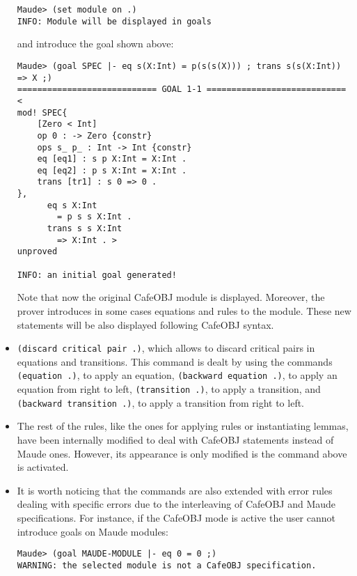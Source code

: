 \begin{itemize}
{\codesize
\begin{verbatim}
Maude> (set module on .)
INFO: Module will be displayed in goals
\end{verbatim}
}

\noindent
and introduce the goal shown above:

{\codesize
\begin{verbatim}
Maude> (goal SPEC |- eq s(X:Int) = p(s(s(X))) ; trans s(s(X:Int)) => X ;)
============================ GOAL 1-1 ============================
<
mod! SPEC{
	[Zero < Int]
	op 0 : -> Zero {constr}
	ops s_ p_ : Int -> Int {constr}
	eq [eq1] : s p X:Int = X:Int .
	eq [eq2] : p s X:Int = X:Int .
	trans [tr1] : s 0 => 0 .
},
	  eq s X:Int
	    = p s s X:Int .
	  trans s s X:Int
	    => X:Int . >
unproved

INFO: an initial goal generated!
\end{verbatim}
}

Note that now the original CafeOBJ module is displayed. Moreover, the prover
introduces in some cases equations and rules to the module. These new statements
will be also displayed following CafeOBJ syntax.

\item
\verb"(discard critical pair .)", which allows to discard critical pairs in equations and transitions.
This command is dealt by using the commands \verb"(equation .)", to apply an equation,
\verb"(backward equation .)", to apply an equation from right to left, \verb"(transition .)", to
apply a transition, and \verb"(backward transition .)", to apply a transition from right to left.

\item
The rest of the rules, like the ones for applying rules or instantiating lemmas,
have been internally modified to deal with CafeOBJ statements instead of Maude ones.
However, its appearance is only modified is the command above is activated.

\item
It is worth noticing that the commands are also extended with error rules dealing
with specific errors due to the interleaving of CafeOBJ and Maude specifications.
For instance, if the CafeOBJ mode is active the user cannot introduce goals on
Maude modules:

{\codesize
\begin{verbatim}
Maude> (goal MAUDE-MODULE |- eq 0 = 0 ;)
WARNING: the selected module is not a CafeOBJ specification.
\end{verbatim}
}

\end{itemize}














